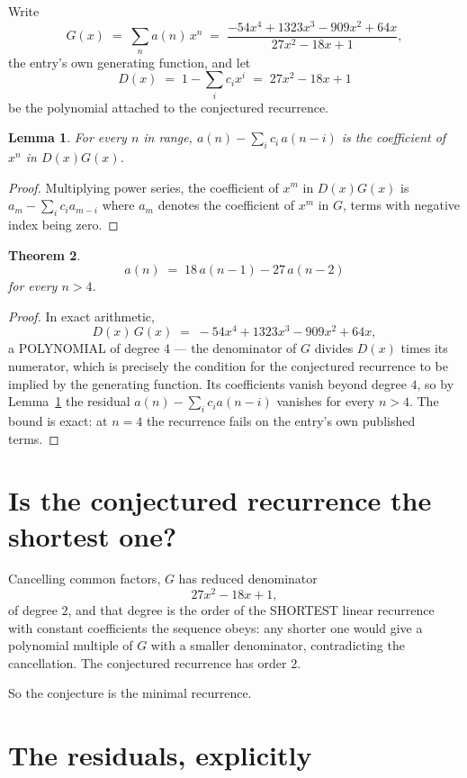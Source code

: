 \documentclass[11pt,a4paper]{article}
\theoremstyle{plain}
\newtheorem{theorem}{Theorem}
\newtheorem{lemma}[theorem]{Lemma}
\theoremstyle{definition}
\begin{document}
Write
\[
G(x)\;=\;\sum_{n}a(n)\,x^{n}\;=\;\frac{- 54 x^{4} + 1323 x^{3} - 909 x^{2} + 64 x}{27 x^{2} - 18 x + 1},
\]
the entry's own generating function, and let
\[
D(x)\;=\;1-\sum_i c_i x^{i}\;=\;27 x^{2} - 18 x + 1
\]
be the polynomial attached to the conjectured recurrence.

\begin{lemma}\label{lem:key}
For every $n$ in range, $a(n)-\sum_i c_i\,a(n-i)$ is the coefficient of $x^{n}$ in
$D(x)G(x)$.
\end{lemma}

\begin{proof}
Multiplying power series, the coefficient of $x^{m}$ in $D(x)G(x)$ is
$a_m-\sum_i c_i a_{m-i}$ where $a_m$ denotes the coefficient of $x^{m}$ in $G$, terms with
negative index being zero.
\end{proof}

\begin{theorem}
\[
a(n)\;=\;18\,a(n-1) - 27\,a(n-2)
\]
for every $n>4$.
\end{theorem}

\begin{proof}
In exact arithmetic,
\[
D(x)\,G(x)\;=\;- 54 x^{4} + 1323 x^{3} - 909 x^{2} + 64 x,
\]
a POLYNOMIAL of degree $4$ --- the denominator of $G$ divides $D(x)$ times its numerator,
which is precisely the condition for the conjectured recurrence to be implied by the
generating function. Its coefficients vanish beyond degree $4$, so by
Lemma~\ref{lem:key} the residual $a(n)-\sum_ic_ia(n-i)$ vanishes for every
$n>4$. The bound is exact: at $n=4$ the recurrence fails on the entry's own published terms.
\end{proof}

\section{Is the conjectured recurrence the shortest one?}

Cancelling common factors, $G$ has reduced denominator
\[
27 x^{2} - 18 x + 1,
\]
of degree $2$, and that degree is the order of the SHORTEST linear recurrence with
constant coefficients the sequence obeys: any shorter one would give a polynomial multiple of
$G$ with a smaller denominator, contradicting the cancellation. The conjectured recurrence has
order $2$.

So the conjecture is the minimal recurrence.

\section{The residuals, explicitly}
\end{document}
